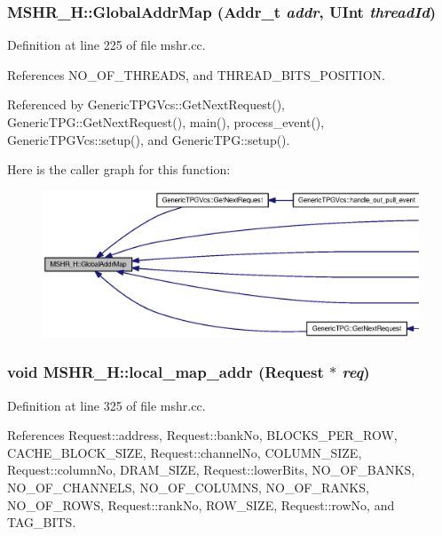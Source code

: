 \subsubsection[{GlobalAddrMap}]{ MSHR\_\-H::GlobalAddrMap ({\bf Addr\_\-t} {\em addr}, \/  {\bf UInt} {\em threadId})}\label{classMSHR__H_3c9cdbe3938dcfd521f48678b335b839}




Definition at line 225 of file mshr.cc.

References NO\_\-OF\_\-THREADS, and THREAD\_\-BITS\_\-POSITION.

Referenced by GenericTPGVcs::GetNextRequest(), GenericTPG::GetNextRequest(), main(), process\_\-event(), GenericTPGVcs::setup(), and GenericTPG::setup().

Here is the caller graph for this function:\nopagebreak
\begin{figure}[H]
\begin{center}
\leavevmode
\includegraphics[width=420pt]{classMSHR__H_3c9cdbe3938dcfd521f48678b335b839_icgraph}
\end{center}
\end{figure}
\subsubsection[{local\_\-map\_\-addr}]{\setlength{\rightskip}{0pt plus 5cm}void MSHR\_\-H::local\_\-map\_\-addr ({\bf Request} $\ast$ {\em req})}\label{classMSHR__H_31a63345b220f9e3eaefc9b4eb012f6b}




Definition at line 325 of file mshr.cc.

References Request::address, Request::bankNo, BLOCKS\_\-PER\_\-ROW, CACHE\_\-BLOCK\_\-SIZE, Request::channelNo, COLUMN\_\-SIZE, Request::columnNo, DRAM\_\-SIZE, Request::lowerBits, NO\_\-OF\_\-BANKS, NO\_\-OF\_\-CHANNELS, NO\_\-OF\_\-COLUMNS, NO\_\-OF\_\-RANKS, NO\_\-OF\_\-ROWS, Request::rankNo, ROW\_\-SIZE, Request::rowNo, and TAG\_\-BITS.

